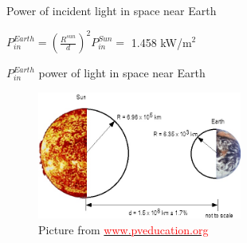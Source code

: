 \documentclass{beamer}
\begin{document}
\begin{frame}{Power of incident light in space near Earth}

\begin{center}
$P_{in}^{Earth} = \left(\frac{R^{sun}}{d}\right)^2 P_{in}^{Sun} =$ 1.458 kW/m$^2$
\end{center}
$P_{in}^{Earth}$ power of  light in space near Earth

\begin{figure} [t]
\includegraphics[width=0.6\textwidth]{figures/figure6_Sun_Earth.jpg}
\caption{Picture from \href{http://www.pveducation.org}{\textcolor{red}{www.pveducation.org}}}
\end{figure}
\end{frame}
\end{document}
